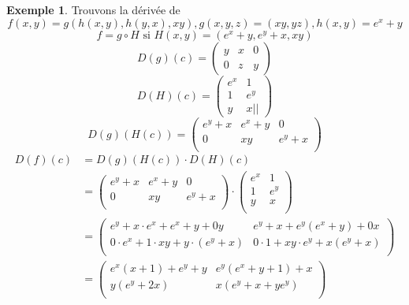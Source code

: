 \documentclass[12pt]{report}
\theoremstyle{definition}
\newtheorem*{example}{Exemple}
\begin{document}
    \begin{example}
        Trouvons la dérivée de 
        $$ f(x,y) = g(h(x,y), h(y,x), xy), g(x,y,z) = (xy, yz), h(x,y) = e^x + y$$
        $$ f = g \circ H \text{ si } H(x, y) = (e^x + y, e^y + x, xy) $$
        $$ D(g)(c) = \begin{pmatrix}
            y & x & 0 \\
            0 & z & y
        \end{pmatrix}$$
        $$ D(H)(c) = \begin{pmatrix}
            e^x & 1 \\
            1 & e^y \\
            y & x ||
        \end{pmatrix}$$
        $$ D(g)(H(c)) = \begin{pmatrix}
            e^y + x & e^x + y & 0 \\
            0 & xy & e^y + x \\
        \end{pmatrix}$$
        \begin{align*} D(f)(c) &= D(g)(H(c)) \cdot D(H)(c) \\
            &= \begin{pmatrix}
                e^y + x & e^x + y & 0 \\
                0 & xy & e^y + x \\
            \end{pmatrix} \cdot \begin{pmatrix}
                e^x & 1 \\
                1 & e^y \\
                y & x \\
            \end{pmatrix}\\
            &= \begin{pmatrix}
                e^y + x \cdot e^x + e^x + y + 0y & e^y + x + e^y(e^x + y) + 0x \\
                0 \cdot e^x + 1 \cdot xy + y \cdot (e^y + x) & 0 \cdot 1 + xy \cdot e^y + x(e^y + x)\\
            \end{pmatrix}\\
            &= \begin{pmatrix}
                e^x(x + 1) + e^y + y & e^y(e^x + y + 1) + x\\
                y(e^y + 2x) & x(e^y + x + ye^y)\\
            \end{pmatrix}
        \end{align*}
    \end{example}
\end{document}
